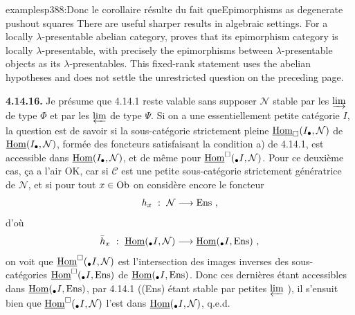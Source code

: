 \begin{dcomment}{examples}{p388:Donc le corollaire résulte du fait que}{Epimorphisms as degenerate pushout squares}
There are useful sharper results in algebraic settings. For a locally $\lambda$-presentable abelian category, \citet[Lemma~10.7]{Positselski2024Limits} proves that its epimorphism category is locally $\lambda$-presentable, with precisely the epimorphisms between $\lambda$-presentable objects as its $\lambda$-presentables. This fixed-rank statement uses the abelian hypotheses and does not settle the unrestricted question on the preceding page.
\end{dcomment}


\textbf{4.14.16.} Je présume que 4.14.1 reste valable sans supposer $\mathcal{N}$ stable par les $\varinjlim$ de type $\Phi$ et par les $\varprojlim$ de type $\Psi$. Si on a une essentiellement petite catégorie $I$, la question est de savoir si la sous-catégorie strictement pleine $\underline{\mathrm{Hom}}_{\square}(I_\bullet,\mathcal{N})$ de $\underline{\mathrm{Hom}}(I_\bullet,\mathcal{N})$, formée des foncteurs satisfaisant
la condition a) de 4.14.1, est accessible dans $\underline{\mathrm{Hom}}(I_\bullet,\mathcal{N})$, et de même pour $\underline{\mathrm{Hom}}^{\square}({}_\bullet I,\mathcal{N})$. Pour ce deuxième cas, ça a l'air OK, car si $\mathcal{C}$ est une petite sous-catégorie strictement génératrice de $\mathcal{N}$, et si pour tout $x \in \operatorname{Ob}$ on considère encore le foncteur
\[
h_x \ : \ \mathcal{N} \longrightarrow \Ens \ ,
\]
d'où
\[
\bar{h}_x \ : \ \underline{\mathrm{Hom}}({}_\bullet I,\mathcal{N}) \longrightarrow \underline{\mathrm{Hom}}({}_\bullet I,\mathrm{Ens}) \ ,
\]
on voit que $\underline{\mathrm{Hom}}^{\square}({}_\bullet I,\mathcal{N})$ est l'intersection des images inverses des sous-catégories $\underline{\mathrm{Hom}}^{\square}({}_\bullet I,\mathrm{Ens})$ de $\underline{\mathrm{Hom}}({}_\bullet I,\mathrm{Ens})$. Donc ces dernières étant accessibles dans $\underline{\mathrm{Hom}}({}_\bullet I,\mathrm{Ens})$, par 4.14.1 ((Ens) étant stable par petites $\varprojlim$ ), il s'ensuit bien que $\underline{\mathrm{Hom}}^{\square}({}_\bullet I,\mathcal{N})$ l'est dans $\underline{\mathrm{Hom}}({}_\bullet I,\mathcal{N})$, q.e.d.

